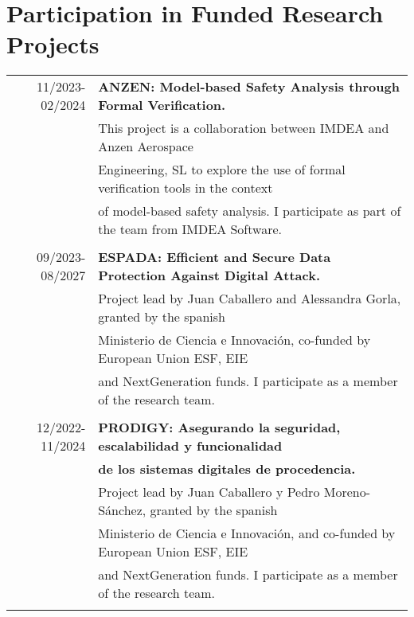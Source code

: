 \documentclass[a4paper,10pt]{article} %
\begin{document}
\section{Participation in Funded Research Projects}
\begin{longtable}{rl}

11/2023-02/2024 & \textbf{ANZEN: Model-based Safety Analysis through Formal Verification.} \\ 
& This project is a collaboration between IMDEA and Anzen Aerospace \\
& Engineering, SL to explore the use of formal verification tools in the context \\
& of model-based safety analysis. I participate as part of the team from IMDEA Software. \\ & \\

09/2023-08/2027 & \textbf{ESPADA: Efficient and Secure Data Protection Against Digital Attack.} \\ 
& Project lead by Juan Caballero and Alessandra Gorla, granted by the spanish \\ 
& Ministerio de Ciencia e Innovación, co-funded by European Union ESF, EIE \\
& and NextGeneration funds. I participate as a member of the research team. \\ & \\

12/2022-11/2024 & \textbf{PRODIGY: Asegurando la seguridad, escalabilidad y funcionalidad} \\
& \textbf{de los sistemas digitales de procedencia.} \\ 
& Project lead by Juan Caballero y Pedro Moreno-Sánchez, granted by the spanish \\
& Ministerio de Ciencia e Innovación, and co-funded by European Union ESF, EIE \\
& and NextGeneration funds. I participate as a member of the research team. \\ & \\

\end{longtable}
\end{document}
